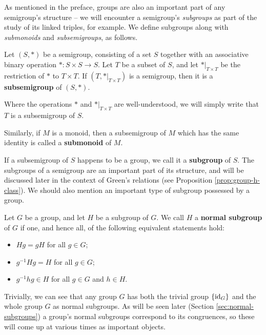 As
mentioned in the preface, groups are also an important part of any semigroup's
structure -- we will encounter a semigroup's \textit{subgroups} as part of the
study of its linked triples, for example.  We define subgroups along with
\textit{submonoids} and \textit{subsemigroups}, as follows.

\begin{definition}
  \label{def:subsemigroup}
  Let $(S, *)$ be a semigroup, consisting of a set $S$ together with an
  associative binary operation $*: S \times S \to S$.
  Let $T$ be a subset of $S$, and let $*|_{T \times T}$ be the restriction of $*$ to $T \times T$.
  If $(T, *|_{T \times T})$ is a semigroup, then it is a \textbf{subsemigroup} of $(S, *)$.

  Where the operations $*$ and $*|_{T \times T}$ are well-understood, we will simply write
  that $T$ is a subsemigroup of $S$.
\end{definition}

Similarly, if $M$ is a monoid, then a subsemigroup of $M$ which has
the same identity is called a \textbf{submonoid} of $M$.  

If a subsemigroup of $S$ happens to be a group, we call it a \textbf{subgroup}
of $S$.  The subgroups of a semigroup are an important part of its structure,
and will be discussed later in the context of Green's relations (see Proposition
\ref{prop:group-h-class}).  We should also mention an important type of subgroup
possessed by a group.  

\begin{definition}
  \label{def:normal-subgroup}
  Let $G$ be a group, and let $H$ be a subgroup of $G$.  We call $H$ a
  \textbf{normal subgroup} of $G$ if one, and hence all, of the following
  equivalent statements hold:
  \begin{itemize}
  \item $Hg = gH$ for all $g \in G$;
  \item $g^{-1}Hg = H$ for all $g \in G$;
  \item $g^{-1}hg \in H$ for all $g \in G$ and $h \in H$.
  \end{itemize}
\end{definition}

Trivially, we can see that any group $G$ has both the trivial group $\{\operatorname{id}_G\}$
and the whole group $G$ as normal subgroups.  As will be seen later (Section
\ref{sec:normal-subgroups}) a group's normal subgroups correspond to its
congruences, so these will come up at various times as important objects.

